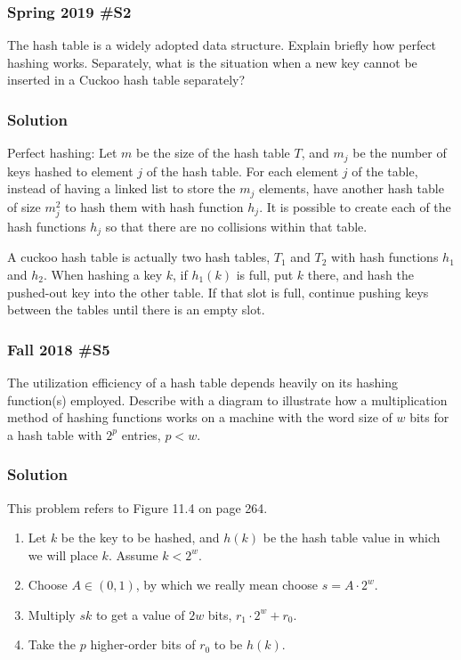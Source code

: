 \subsubsection{Spring 2019 \#S2}

The hash table is a widely adopted data structure.  Explain briefly how perfect hashing works.  Separately, what is the situation when a new key cannot be inserted in a Cuckoo hash table separately?

\subsubsection{Solution}

Perfect hashing:  Let $m$ be the size of the hash table $T$, and $m_j$ be the number of keys hashed to element $j$ of the hash table.  For each element $j$ of the table, instead of having a linked list to store the $m_j$ elements, have another hash table of size $m_j^2$ to hash them with hash function $h_j$.  It is possible to create each of the hash functions $h_j$ so that there are no collisions within that table.  

A cuckoo hash table is actually two hash tables, $T_1$ and $T_2$ with hash functions $h_1$ and $h_2$.  When hashing a key $k$, if $h_1(k)$ is full, put $k$ there, and hash the pushed-out key into the other table.  If that slot is full, continue pushing keys between the tables until there is an empty slot.  


\subsubsection{Fall 2018 \#S5}

The utilization efficiency of a hash table depends heavily on its hashing function(s) employed.  Describe with a diagram to illustrate how a multiplication method of hashing functions works on a machine with the word size of $w$ bits for a hash table with $2^p$ entries, $p<w$.  

\subsubsection{Solution}

This problem refers to Figure 11.4 on page 264.  

\begin{enumerate}
	\item Let $k$ be the key to be hashed, and $h(k)$ be the hash table value in which we will place $k$.  Assume $k < 2^w$.    
	\item Choose $A \in (0,1)$, by which we really mean choose $s = A \cdot 2^w$.
	\item Multiply $sk$ to get a value of $2w$ bits, $r_1 \cdot 2^w + r_0$.  
	\item Take the $p$ higher-order bits of $r_0$ to be $h(k)$.  
\end{enumerate}

